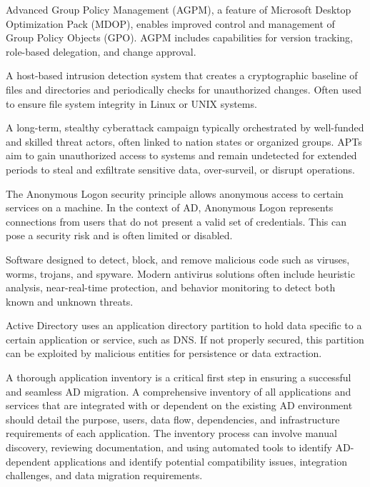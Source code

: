  Advanced Group Policy Management (AGPM), a feature of Microsoft Desktop Optimization Pack (MDOP), enables improved control and management of Group Policy Objects (GPO). AGPM includes capabilities for version tracking, role-based delegation, and change approval.

 A host-based intrusion detection system that creates a cryptographic baseline of files and directories and periodically checks for unauthorized changes. Often used to ensure file system integrity in Linux or UNIX systems.

 A long-term, stealthy cyberattack campaign typically orchestrated by well-funded and skilled threat actors, often linked to nation states or organized groups. APTs aim to gain unauthorized access to systems and remain undetected for extended periods to steal and exfiltrate sensitive data, over-surveil, or disrupt operations.

 The Anonymous Logon security principle allows anonymous access to certain services on a machine. In the context of AD, Anonymous Logon represents connections from users that do not present a valid set of credentials. This can pose a security risk and is often limited or disabled.

 Software designed to detect, block, and remove malicious code such as viruses, worms, trojans, and spyware. Modern antivirus solutions often include heuristic analysis, near-real-time protection, and behavior monitoring to detect both known and unknown threats.

 Active Directory uses an application directory partition to hold data specific to a certain application or service, such as DNS. If not properly secured, this partition can be exploited by malicious entities for persistence or data extraction.

 A thorough application inventory is a critical first step in ensuring a successful and seamless AD migration. A comprehensive inventory of all applications and services that are integrated with or dependent on the existing AD environment should detail the purpose, users, data flow, dependencies, and infrastructure requirements of each application. The inventory process can involve manual discovery, reviewing documentation, and using automated tools to identify AD-dependent applications and identify potential compatibility issues, integration challenges, and data migration requirements.

